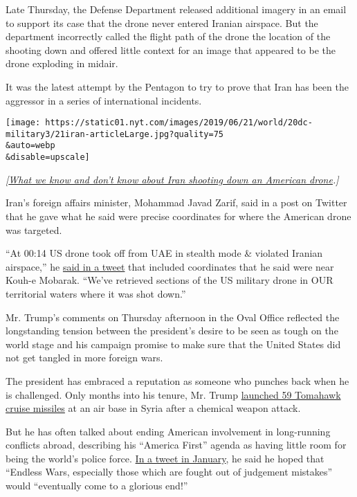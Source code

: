 Late Thursday, the Defense Department released additional imagery in an
email to support its case that the drone never entered Iranian airspace.
But the department incorrectly called the flight path of the drone the
location of the shooting down and offered little context for an image
that appeared to be the drone exploding in midair.

It was the latest attempt by the Pentagon to try to prove that Iran has
been the aggressor in a series of international incidents.

\texttt{[image: https://static01.nyt.com/images/2019/06/21/world/20dc-military3/21iran-articleLarge.jpg?quality=75\\\&auto=webp\\\&disable=upscale]}

\emph{{[}}\href{https://www.nytimes.com/2019/06/20/us/politics/iran-drone.html}{\emph{What
we know and don't know about Iran shooting down an American
drone}}\emph{.{]}}

Iran's foreign affairs minister, Mohammad Javad Zarif, said in a post on
Twitter that he gave what he said were precise coordinates for where the
American drone was targeted.

``At 00:14 US drone took off from UAE in stealth mode \& violated
Iranian airspace,'' he
\href{https://twitter.com/JZarif/status/1141772824086028288}{said in a
tweet} that included coordinates that he said were near Kouh-e Mobarak.
``We've retrieved sections of the US military drone in OUR territorial
waters where it was shot down.''

Mr. Trump's comments on Thursday afternoon in the Oval Office reflected
the longstanding tension between the president's desire to be seen as
tough on the world stage and his campaign promise to make sure that the
United States did not get tangled in more foreign wars.

The president has embraced a reputation as someone who punches back when
he is challenged. Only months into his tenure, Mr. Trump
\href{https://www.nytimes.com/2017/04/06/world/middleeast/us-said-to-weigh-military-responses-to-syrian-chemical-attack.html}{launched
59 Tomahawk cruise missiles} at an air base in Syria after a chemical
weapon attack.

But he has often talked about ending American involvement in
long-running conflicts abroad, describing his ``America First'' agenda
as having little room for being the world's police force.
\href{https://twitter.com/realDonaldTrump/status/1082484663216730113}{In
a tweet in January}, he said he hoped that ``Endless Wars, especially
those which are fought out of judgement mistakes'' would ``eventually
come to a glorious end!''

